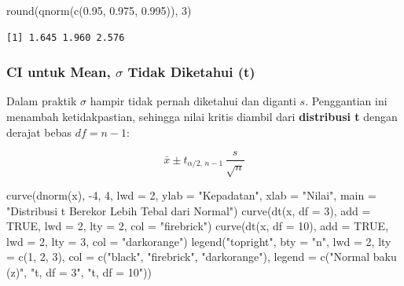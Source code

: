\documentclass[
  indonesian,
  letterpaper,
]{book}
\newenvironment{Shaded}{\begin{snugshade}}{\end{snugshade}}
\newcommand{\AttributeTok}[1]{\textcolor[rgb]{0.40,0.45,0.13}{#1}}
\newcommand{\ConstantTok}[1]{\textcolor[rgb]{0.56,0.35,0.01}{#1}}
\newcommand{\DecValTok}[1]{\textcolor[rgb]{0.68,0.00,0.00}{#1}}
\newcommand{\FloatTok}[1]{\textcolor[rgb]{0.68,0.00,0.00}{#1}}
\newcommand{\FunctionTok}[1]{\textcolor[rgb]{0.28,0.35,0.67}{#1}}
\newcommand{\NormalTok}[1]{\textcolor[rgb]{0.00,0.23,0.31}{#1}}
\newcommand{\SpecialCharTok}[1]{\textcolor[rgb]{0.37,0.37,0.37}{#1}}
\newcommand{\StringTok}[1]{\textcolor[rgb]{0.13,0.47,0.30}{#1}}
\begin{document}
\begin{Shaded}
\begin{Highlighting}[]
\FunctionTok{round}\NormalTok{(}\FunctionTok{qnorm}\NormalTok{(}\FunctionTok{c}\NormalTok{(}\FloatTok{0.95}\NormalTok{, }\FloatTok{0.975}\NormalTok{, }\FloatTok{0.995}\NormalTok{)), }\DecValTok{3}\NormalTok{)}
\end{Highlighting}
\end{Shaded}

\begin{verbatim}
[1] 1.645 1.960 2.576
\end{verbatim}

\subsubsection{\texorpdfstring{CI untuk Mean, \(\sigma\) Tidak Diketahui
(t)}{CI untuk Mean, \textbackslash sigma Tidak Diketahui (t)}}\label{ci-untuk-mean-sigma-tidak-diketahui-t}

Dalam praktik \(\sigma\) hampir tidak pernah diketahui dan diganti
\(s\). Penggantian ini menambah ketidakpastian, sehingga nilai kritis
diambil dari \textbf{distribusi t} dengan derajat bebas \(df = n - 1\):

\[
\bar{x} \pm t_{\alpha/2,\,n-1}\,\frac{s}{\sqrt{n}}
\]

\begin{Shaded}
\begin{Highlighting}[]
\FunctionTok{curve}\NormalTok{(}\FunctionTok{dnorm}\NormalTok{(x), }\SpecialCharTok{{-}}\DecValTok{4}\NormalTok{, }\DecValTok{4}\NormalTok{, }\AttributeTok{lwd =} \DecValTok{2}\NormalTok{, }\AttributeTok{ylab =} \StringTok{"Kepadatan"}\NormalTok{, }\AttributeTok{xlab =} \StringTok{"Nilai"}\NormalTok{,}
      \AttributeTok{main =} \StringTok{"Distribusi t Berekor Lebih Tebal dari Normal"}\NormalTok{)}
\FunctionTok{curve}\NormalTok{(}\FunctionTok{dt}\NormalTok{(x, }\AttributeTok{df =} \DecValTok{3}\NormalTok{), }\AttributeTok{add =} \ConstantTok{TRUE}\NormalTok{, }\AttributeTok{lwd =} \DecValTok{2}\NormalTok{, }\AttributeTok{lty =} \DecValTok{2}\NormalTok{, }\AttributeTok{col =} \StringTok{"firebrick"}\NormalTok{)}
\FunctionTok{curve}\NormalTok{(}\FunctionTok{dt}\NormalTok{(x, }\AttributeTok{df =} \DecValTok{10}\NormalTok{), }\AttributeTok{add =} \ConstantTok{TRUE}\NormalTok{, }\AttributeTok{lwd =} \DecValTok{2}\NormalTok{, }\AttributeTok{lty =} \DecValTok{3}\NormalTok{, }\AttributeTok{col =} \StringTok{"darkorange"}\NormalTok{)}
\FunctionTok{legend}\NormalTok{(}\StringTok{"topright"}\NormalTok{, }\AttributeTok{bty =} \StringTok{"n"}\NormalTok{, }\AttributeTok{lwd =} \DecValTok{2}\NormalTok{, }\AttributeTok{lty =} \FunctionTok{c}\NormalTok{(}\DecValTok{1}\NormalTok{, }\DecValTok{2}\NormalTok{, }\DecValTok{3}\NormalTok{), }\AttributeTok{col =} \FunctionTok{c}\NormalTok{(}\StringTok{"black"}\NormalTok{, }\StringTok{"firebrick"}\NormalTok{, }\StringTok{"darkorange"}\NormalTok{),}
       \AttributeTok{legend =} \FunctionTok{c}\NormalTok{(}\StringTok{"Normal baku (z)"}\NormalTok{, }\StringTok{"t, df = 3"}\NormalTok{, }\StringTok{"t, df = 10"}\NormalTok{))}
\end{Highlighting}
\end{Shaded}
\end{document}
